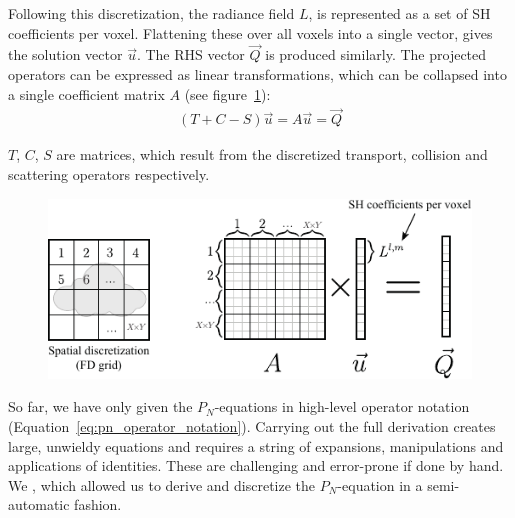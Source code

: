Following this discretization, the radiance field $L$, is represented as a set of SH coefficients per voxel. Flattening these over all voxels into a single vector, gives the solution vector $\vec{u}$. The RHS vector $\vec{Q}$ is produced similarly. The projected operators can be expressed as linear transformations, which can be collapsed into a single coefficient matrix $A$ (see figure~\ref{fig:matrix_layout}):
\begin{align}
(T+C-S)\vec{u} = A\vec{u} = \vec{Q}
\end{align}

$T$, $C$, $S$ are matrices, which result from the discretized transport, collision and scattering operators respectively.

\begin{figure}[h]
\centering
\includegraphics[width=\columnwidth]{figures/fig_matrix_layout.pdf}
\vspace{-0.2in}
\label{fig:matrix_layout}
\end{figure}

So far, we have only given the $P_N$-equations in high-level operator notation (Equation~\ref{eq:pn_operator_notation}). Carrying out the full derivation creates large, unwieldy equations and requires a string of expansions, manipulations and applications of identities. These are challenging and error-prone if done by hand. We , which allowed us to derive and discretize the $P_N$-equation in a semi-automatic fashion.

